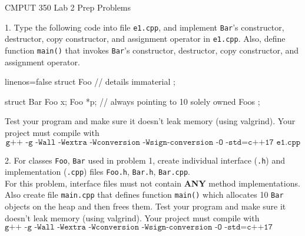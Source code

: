 \documentclass[a4paper,11pt]{article}
\begin{document}

\begin{center}
{\Large CMPUT 350 Lab 2 Prep Problems}
\end{center}


\linerule

1. Type the following code into file \texttt{e1.cpp}, 
and implement \texttt{Bar}'s constructor, destructor, copy constructor, and assignment operator in \texttt{e1.cpp}.
Also, define function \texttt{main()} that invokes \texttt{Bar}'s constructor, destructor, copy constructor, and assignment operator.

\begin{cppcode*}{linenos=false}
struct Foo {
    // details immaterial
};

struct Bar {
    Foo x;
    Foo *p;     // always pointing to 10 solely owned Foos
};
\end{cppcode*}

Test your program and make sure it doesn't leak memory (using valgrind).
Your project must compile with 
\[ \texttt{g++ -g -Wall -Wextra -Wconversion -Wsign-conversion -O -std=c++17 e1.cpp} \]

\linerule

2. For classes \texttt{Foo}, \texttt{Bar} used in problem 1, 
create individual interface (\texttt{.h}) and implementation (\texttt{.cpp}) files 
\texttt{Foo.h}, \texttt{Bar.h}, \texttt{Bar.cpp}. \\

For this problem, interface files must not contain \textbf{ANY} method implementations.
Also create file \texttt{main.cpp} that defines function \texttt{main()} which allocates 10 \texttt{Bar} objects on the heap and then frees them.
Test your program and make sure it doesn't leak memory (using valgrind).
Your project must compile with 
\[ \texttt{g++ -g -Wall -Wextra -Wconversion -Wsign-conversion -O -std=c++17 Bar.cpp main.cpp} \]
\end{document}
